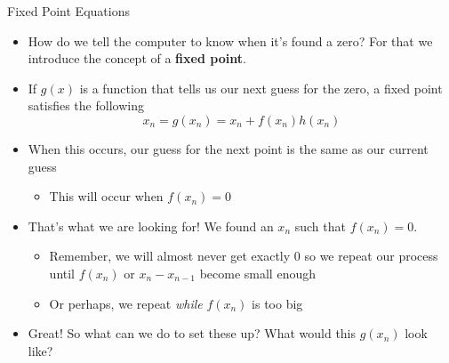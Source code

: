 {}\documentclass[letterpaper,
compress,
xcolor=x11names,
]{beamer}
\begin{document}
\begin{frame}{Fixed Point Equations}
	\footnotesize
	\begin{itemize}
		\item How do we tell the computer to know when it's found a zero? For that we introduce the concept of a \textbf{fixed point}. 
		\item<2-> If $g(x)$ is a function that tells us our next guess for the zero, a fixed point satisfies the following
		\begin{equation*}
			x_n = g(x_n) = x_n + f(x_n)h(x_n)
		\end{equation*}
		\item<3-> When this occurs, our guess for the next point is the same as our current guess
		\begin{itemize}
			\item This will occur when $f(x_n) = 0$
		\end{itemize}
		\item<4-> That's what we are looking for! We found an $x_n$ such that $f(x_n)=0$.
		\begin{itemize}
			\item Remember, we will almost never get exactly 0 so we repeat our process until $f(x_n)$ or $x_n - x_{n-1}$ become small enough
			\item Or perhaps, we repeat \textit{while} $f(x_n)$ is too big
		\end{itemize}
		\item<5-> Great! So what can we do to set these up? What would this $g(x_n)$ look like?
	\end{itemize}
\end{frame}

\end{document}
